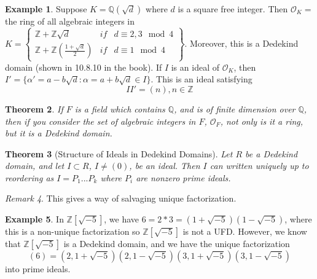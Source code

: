 \documentclass[12pt]{article}
\newtheorem{thm}{Theorem}[section]
\theoremstyle{definition}
\newtheorem{eg}[thm]{Example}
\theoremstyle{remark}
\newtheorem{rmk}[thm]{Remark}
\numberwithin{equation}{section}
\newcommand\Z{\mathbb Z}    %
\newcommand\Q{\mathbb Q}    %
\begin{document}
\vspace{15pt}

\begin{eg}
        Suppose $K = \Q(\sqrt{d})$ where $d$ is a square free integer. Then $\mathcal{O}_K = $ the ring of all algebraic integers in $K = \left\{\begin{array}{ccc} \Z+\Z\sqrt{d} & if & d \equiv 2,3 \mod 4 \\ \Z+\Z\left(\frac{1+\sqrt{d}}{2}\right) & if & d \equiv 1 \mod 4 \end{array}\right\}$. Moreover, this is a Dedekind domain (shown in 10.8.10 in the book). If $I$ is an ideal of $\mathcal{O}_K$, then $I' = \{\alpha' = a-b\sqrt{d}:\alpha = a+b\sqrt{d} \in I\}$. This is an ideal satisfying \begin{equation}
                II' = (n), n \in \Z
        \end{equation}
\end{eg}

\vspace{15pt}


\begin{thm}
        If $F$ is a field which contains $\Q$, and is of finite dimension over $\Q$, then if you consider the set of algebraic integers in $F$, $\mathcal{O}_F$, not only is it a ring, but it is a Dedekind domain.
\end{thm}

\vspace{15pt}

\begin{thm}[Structure of Ideals in Dedekind Domains]
        Let $R$ be a Dedekind domain, and let $I \subset R$, $I \neq (0)$, be an ideal. Then $I$ can written uniquely up to reordering as $I = P_1...P_k$ where $P_i$ are nonzero prime ideals.
\end{thm}

\vspace{15pt}


\begin{rmk}
        This gives a way of salvaging unique factorization.
\end{rmk}

\vspace{15pt}


\begin{eg}
        In $\Z[\sqrt{-5}]$, we have $6 = 2*3 = (1+\sqrt{-5})(1-\sqrt{-5})$, where this is a non-unique factorization so $\Z[\sqrt{-5}]$ is not a UFD. However, we know that $\Z[\sqrt{-5}]$ is a Dedekind domain, and we have the unique factorization \begin{equation}
                (6) = (2,1+\sqrt{-5})(2,1-\sqrt{-5})(3,1+\sqrt{-5})(3,1-\sqrt{-5})
        \end{equation}
        into prime ideals.
\end{eg}
\end{document}
